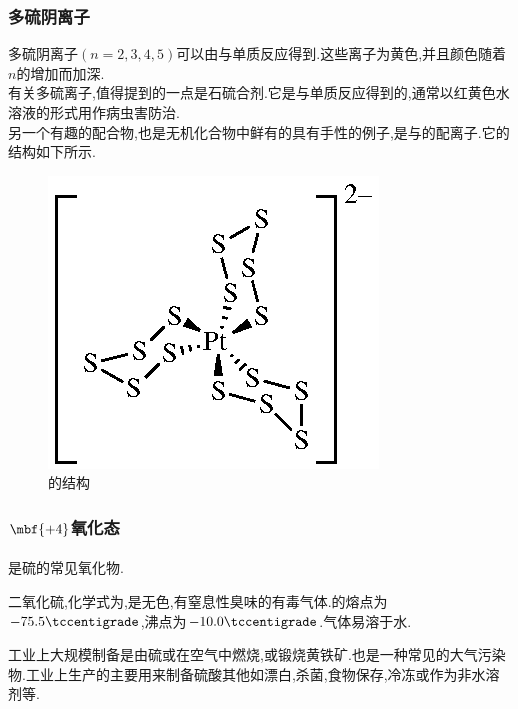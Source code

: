 \documentclass{ctexart}
\begin{document}
\subsubsection{多硫阴离子}
多硫阴离子$\left(n=2,3,4,5\right)$可以由与单质反应得到.这些离子为黄色,并且颜色随着$n$的增加而加深.\\
\indent 有关多硫离子,值得提到的一点是石硫合剂.它是与单质反应得到的,通常以红黄色水溶液的形式用作病虫害防治.\\
\indent 另一个有趣的配合物,也是无机化合物中鲜有的具有手性的例子,是与的配离子.它的结构如下所示.
\begin{figure}[H]
    \centering\includegraphics{picture/PtS15.eps}
    \caption{的结构}
\end{figure}
\subsubsection{$\mbf{+4}$氧化态}
\paragraph{}
是硫的常见氧化物.
\begin{substance}[\ce{SO2}]
    二氧化硫,化学式为,是无色,有窒息性臭味的有毒气体.的熔点为$-75.5\tccentigrade$,沸点为$-10.0\tccentigrade$.气体易溶于水.
\end{substance}
工业上大规模制备是由硫或在空气中燃烧,或锻烧黄铁矿.也是一种常见的大气污染物.工业上生产的主要用来制备硫酸其他如漂白,杀菌,食物保存,冷冻或作为非水溶剂等.
\end{document}
